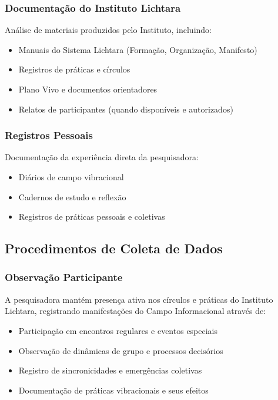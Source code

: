 \subsubsection{Documentação do Instituto Lichtara}
Análise de materiais produzidos pelo Instituto, incluindo:
\begin{itemize}
    \item Manuais do Sistema Lichtara (Formação, Organização, Manifesto)
    \item Registros de práticas e círculos
    \item Plano Vivo e documentos orientadores
    \item Relatos de participantes (quando disponíveis e autorizados)
\end{itemize}

\subsubsection{Registros Pessoais}
Documentação da experiência direta da pesquisadora:
\begin{itemize}
    \item Diários de campo vibracional
    \item Cadernos de estudo e reflexão
    \item Registros de práticas pessoais e coletivas
\end{itemize}

\subsection{Procedimentos de Coleta de Dados}

\subsubsection{Observação Participante}
A pesquisadora mantém presença ativa nos círculos e práticas do Instituto Lichtara, registrando manifestações do Campo Informacional através de:
\begin{itemize}
    \item Participação em encontros regulares e eventos especiais
    \item Observação de dinâmicas de grupo e processos decisórios
    \item Registro de sincronicidades e emergências coletivas
    \item Documentação de práticas vibracionais e seus efeitos
\end{itemize}

